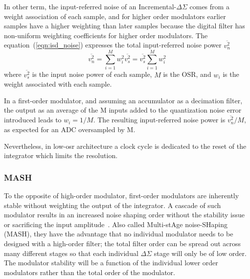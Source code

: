 In other term, the input-referred noise of an Incremental-\(\Delta\Sigma \) comes from a weight association of each sample, and for higher order modulators earlier samples have a higher weighting than later samples because the digital filter has non-uniform weighting coefficients for higher order modulators. The equation~(\ref{eqn:isd_noise}) expresses the total input-referred noise power \(\overline{v_{n}^{2}}\)
\begin{equation}
	\overline{v_{n}^{2}}=\sum_{i=1}^{M}w_{i}^{2}\overline{v_{s}^{2}}=\overline{v_{s}^{2}}\sum_{i=1}^{M}w_{i}^{2}
\label{eqn:isd_noise}
\end{equation}
where \(\overline{v_{s}^{2}}\) is the input noise power of each sample, \(M\) is the OSR, and \(w_i\) is the weight associated with each sample.

In a first-order modulator, and assuming an accumulator as a decimation filter, the output as an average of the M inputs added to the quantization noise error introduced leads to \(w_i=1/M\). The resulting input-referred noise power is \(\overline{v_{n}^{2}}/M\), as expected for an ADC oversampled by M.

Nevertheless, in low-osr architecture a clock cycle is dedicated to the reset of the integrator which limits the resolution.

\subsubsection{MASH}
To the opposite of high-order modulator, first-order modulators are inherently stable without weighting the output of the integrator. A cascade of such modulator results in an increased noise shaping order without the stability issue or sacrificing the input amplitude~\cite{Brooks1997}. Also called Multi-stAge noise-SHaping (MASH), they have the advantage that no individual modulator needs to be designed with a high-order filter; the total filter order can be spread out across many different stages so that each individual \(\Delta\Sigma \) stage will only be of low order. The modulator stability will be a function of the individual lower order modulators rather than the total order of the modulator.

